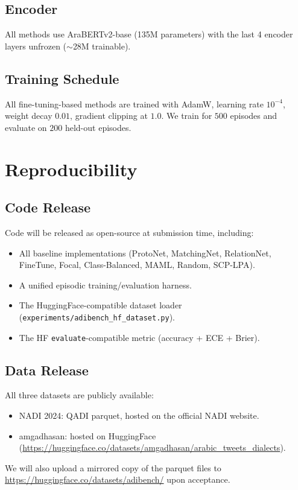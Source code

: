 \documentclass[11pt,a4paper]{article}
\begin{document}
\subsection{Encoder}
All methods use AraBERTv2-base \citep{Antoun2020} (135M parameters)
with the last 4 encoder layers unfrozen ($\sim$28M trainable).

\subsection{Training Schedule}
All fine-tuning-based methods are trained with AdamW, learning rate
$10^{-4}$, weight decay $0.01$, gradient clipping at $1.0$. We train
for $500$ episodes and evaluate on $200$ held-out episodes.

\section{Reproducibility}

\subsection{Code Release}
Code will be released as open-source at submission time, including:
\begin{itemize}\itemsep0pt
\item All baseline implementations (ProtoNet, MatchingNet, RelationNet,
      FineTune, Focal, Class-Balanced, MAML, Random, SCP-LPA).
\item A unified episodic training/evaluation harness.
\item The HuggingFace-compatible dataset loader
      (\texttt{experiments/adibench\_hf\_dataset.py}).
\item The HF \texttt{evaluate}-compatible metric (accuracy + ECE + Brier).
\end{itemize}

\subsection{Data Release}
All three datasets are publicly available:
\begin{itemize}\itemsep0pt
\item NADI 2024: QADI parquet, hosted on the official NADI website.
\item amgadhasan: hosted on HuggingFace
      (\url{https://huggingface.co/datasets/amgadhasan/arabic_tweets_dialects}).
\end{itemize}
We will also upload a mirrored copy of the parquet files to
\url{https://huggingface.co/datasets/adibench/} upon acceptance.
\end{document}
